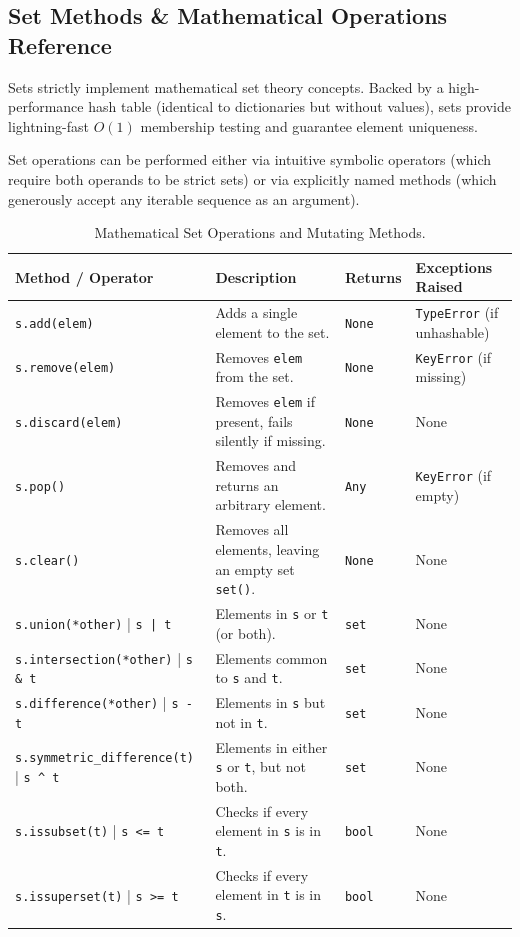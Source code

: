 \subsection{Set Methods \& Mathematical Operations Reference}

Sets strictly implement mathematical set theory concepts. Backed by a high-performance hash table (identical to dictionaries but without values), sets provide lightning-fast $O(1)$ membership testing and guarantee element uniqueness. 

Set operations can be performed either via intuitive symbolic operators (which require both operands to be strict sets) or via explicitly named methods (which generously accept any iterable sequence as an argument). \examBadge

\begin{table}[htbp]
\centering
\small
\renewcommand{\arraystretch}{1.2}
\begin{tabularx}{\linewidth}{l>{\raggedright\arraybackslash}Xl>{\raggedright\arraybackslash}X}
\toprule
\textbf{Method / Operator} & \textbf{Description} & \textbf{Returns} & \textbf{Exceptions Raised} \\
\midrule
\texttt{s.add(elem)} & Adds a single element to the set. & \texttt{None} & \texttt{TypeError} (if unhashable) \\
\texttt{s.remove(elem)} & Removes \texttt{elem} from the set. & \texttt{None} & \texttt{KeyError} (if missing) \\
\texttt{s.discard(elem)} & Removes \texttt{elem} if present, fails silently if missing. & \texttt{None} & None \\
\texttt{s.pop()} & Removes and returns an arbitrary element. & \texttt{Any} & \texttt{KeyError} (if empty) \\
\texttt{s.clear()} & Removes all elements, leaving an empty set \texttt{set()}. & \texttt{None} & None \\
\texttt{s.union(*other)} | \texttt{s | t} & Elements in \texttt{s} or \texttt{t} (or both). & \texttt{set} & None \\
\texttt{s.intersection(*other)} | \texttt{s \& t} & Elements common to \texttt{s} and \texttt{t}. & \texttt{set} & None \\
\texttt{s.difference(*other)} | \texttt{s - t} & Elements in \texttt{s} but not in \texttt{t}. & \texttt{set} & None \\
\texttt{s.symmetric\_difference(t)} | \texttt{s \textasciicircum\ t} & Elements in either \texttt{s} or \texttt{t}, but not both. & \texttt{set} & None \\
\texttt{s.issubset(t)} | \texttt{s <= t} & Checks if every element in \texttt{s} is in \texttt{t}. & \texttt{bool} & None \\
\texttt{s.issuperset(t)} | \texttt{s >= t} & Checks if every element in \texttt{t} is in \texttt{s}. & \texttt{bool} & None \\
\bottomrule
\end{tabularx}
\caption{Mathematical Set Operations and Mutating Methods.}
\label{tab:master-set-methods}
\end{table}

